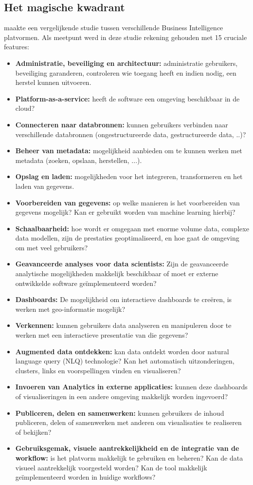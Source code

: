\subsection{Het magische kwadrant}
\textcite{Gartner2019} maakte een vergelijkende studie tussen verschillende Business Intelligence platvormen. Als meetpunt werd in deze studie rekening gehouden met 15 cruciale features:
\begin{itemize}
	\item \textbf{Administratie, beveiliging en architectuur:} administratie gebruikers, beveiliging garanderen, controleren wie toegang heeft en indien nodig, een herstel kunnen uitvoeren.
	\item \textbf{Platform-as-a-service:} heeft de software een omgeving beschikbaar in de cloud?
	\item \textbf{Connecteren naar databronnen:} kunnen gebruikers verbinden naar verschillende databronnen (ongestructureerde data, gestructureerde data, ..)?
	\item \textbf{Beheer van metadata:} mogelijkheid aanbieden om te kunnen werken met metadata (zoeken, opslaan, herstellen, ...).
	\item \textbf{Opslag en laden:} mogelijkheden voor het integreren, transformeren en het laden van gegevens.
	\item \textbf{Voorbereiden van gegevens:}  op welke manieren is het voorbereiden van gegevens mogelijk? Kan er gebruikt worden van machine learning hierbij?
	\item \textbf{Schaalbaarheid:} hoe wordt er omgegaan met enorme volume data, complexe data modellen, zijn de prestaties geoptimaliseerd, en hoe gaat de omgeving om met veel gebruikers?
	\item \textbf{Geavanceerde analyses voor data scientists:} Zijn de geavanceerde analytische mogelijkheden makkelijk beschikbaar of moet er externe ontwikkelde software geïmplementeerd worden?
	\item \textbf{Dashboards:} De mogelijkheid om interactieve dashboards te creëren, is werken met geo-informatie mogelijk?
	\item \textbf{Verkennen:} kunnen gebruikers data analyseren en manipuleren door te werken met een interactieve presentatie van die gegevens?
	\item \textbf{Augmented data ontdekken:} kan data ontdekt worden door natural language query (NLQ) technologie? Kan het automatisch uitzonderingen, clusters, links en voorspellingen vinden en visualiseren?
	\item \textbf{Invoeren van Analytics in externe applicaties:} kunnen deze dashboards of visualiseringen in een andere omgeving makkelijk worden ingevoerd?
	\item \textbf{Publiceren, delen en samenwerken: } kunnen gebruikers de inhoud publiceren, delen of samenwerken met anderen om visualisaties te realiseren of bekijken?
	\item \textbf{Gebruiksgemak, visuele aantrekkelijkheid en de integratie van de workflow:} is het platvorm makkelijk te gebruiken en beheren? Kan de data visueel aantrekkelijk voorgesteld worden? Kan de tool makkelijk geïmplementeerd worden in huidige workflows?
\end{itemize} 

